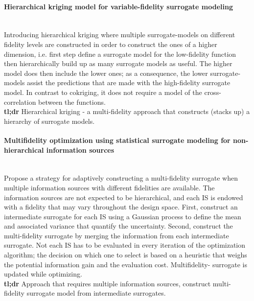 \documentclass[preprint,12pt]{elsarticle}
\begin{document}
\paragraph{Hierarchical kriging model for variable-fidelity surrogate modeling}
\cite{han2012hierarchical}\\Introducing hierarchical kriging where multiple surrogate-models on different fidelity levels are constructed in order to construct the ones of a higher dimension, i.e. first step define a surrogate model for the low-fidelity function then hierarchically build up as many surrogate models as useful. The higher model does then include the lower ones; as a consequence, the lower surrogate-models assist the predictions that are made with the high-fidelity surrogate model. In contrast to cokriging, it does not require a model of the cross-correlation between the functions. 
\\ \textbf{tl;dr} Hierarchical kriging - a multi-fidelity approach that constructs (stacks up) a hierarchy of surrogate models.
\paragraph{Multifidelity optimization using statistical surrogate modeling for non-hierarchical information sources}
\cite{lam2015multifidelity}\\
Propose a strategy for adaptively constructing a multi-fidelity surrogate when multiple information sources with different fidelities are available. The information sources are not expected to be hierarchical, and each IS is endowed with a fidelity that may vary throughout the design space. 
First, construct an intermediate surrogate for each IS using a Gaussian process to define the mean and associated variance that quantify the uncertainty. Second, construct the multi-fidelity surrogate by merging the information from each intermediate surrogate.
Not each IS has to be evaluated in every iteration of the optimization algorithm; the decision on which one to select is based on a heuristic that weighs the potential information gain and the evaluation cost. Multifidelity- surrogate is updated while optimizing. \\
\textbf{tl;dr} Approach that requires multiple information sources, construct multi-fidelity surrogate model from intermediate surrogates.
\end{document}

